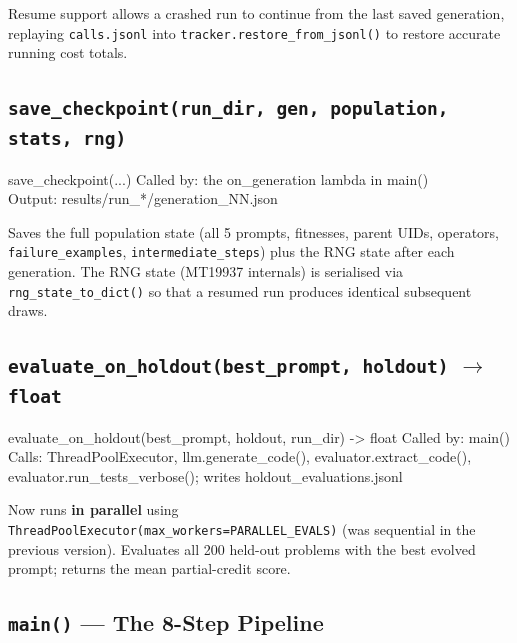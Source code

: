 \documentclass[11pt,a4paper]{report}
\newcommand{\fn}[1]{\texttt{#1}}
\begin{document}
Resume support allows a crashed run to continue from the last saved generation,
replaying \fn{calls.jsonl} into \fn{tracker.restore\_from\_jsonl()} to restore
accurate running cost totals.

\subsection{\fn{save\_checkpoint(run\_dir, gen, population, stats, rng)}}

\begin{spec}{save\_checkpoint(...)}
Called by: the on\_generation lambda in main() \\
Output: results/run\_*/generation\_NN.json
\end{spec}

Saves the full population state (all 5 prompts, fitnesses, parent UIDs, operators,
\fn{failure\_examples}, \fn{intermediate\_steps}) plus the RNG state after each
generation.  The RNG state (MT19937 internals) is serialised via
\fn{rng\_state\_to\_dict()} so that a resumed run produces identical subsequent draws.

\subsection{\fn{evaluate\_on\_holdout(best\_prompt, holdout)} $\to$ \fn{float}}

\begin{spec}{evaluate\_on\_holdout(best\_prompt, holdout, run\_dir) -> float}
Called by: main() \\
Calls: ThreadPoolExecutor, llm.generate\_code(), evaluator.extract\_code(),
evaluator.run\_tests\_verbose(); writes holdout\_evaluations.jsonl
\end{spec}

Now runs \textbf{in parallel} using \fn{ThreadPoolExecutor(max\_workers=PARALLEL\_EVALS)}
(was sequential in the previous version).  Evaluates all 200 held-out problems with
the best evolved prompt; returns the mean partial-credit score.

\subsection{\fn{main()} --- The 8-Step Pipeline}
\end{document}
